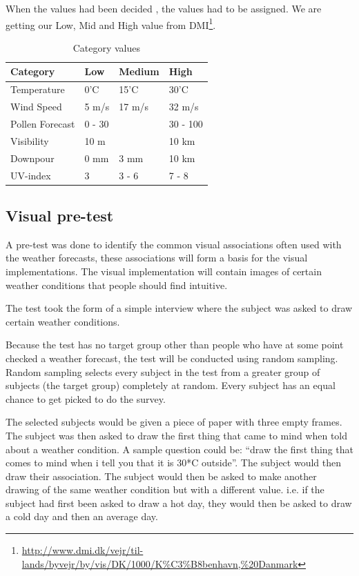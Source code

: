 When the values had been decided , the values had to be assigned. We are getting our Low, Mid and High value from DMI\footnote{\url{http://www.dmi.dk/vejr/til-lands/byvejr/by/vis/DK/1000/K\%C3\%B8benhavn,\%20Danmark}}.

\begin{table}[!h]
\centering
\begin{tabular}{l | l | l | l}
Category & Low & Medium & High \\
\hline \hline
Temperature & 0'C & 15'C & 30'C \\
Wind Speed & 5 m/s & 17 m/s & 32 m/s \\
Pollen Forecast & 0 - 30 & & 30 - 100 \\
Visibility & 10 m & & 10 km \\
Downpour & 0 mm & 3 mm & 10 km \\
UV-index & 3 & 3 - 6 & 7 - 8 
\end{tabular}
\caption{Category values}
\label{tab:category_values}
\end{table}


\subsection{Visual pre-test} %
\label{sub:visual_pre_test}

A pre-test was done to identify the common visual associations often used with the weather forecasts, these associations will form a basis for the visual implementations. 
The visual implementation will contain images of certain weather conditions that people should find intuitive.

The test took the form of a simple interview where the subject was asked to draw certain weather conditions.

Because the test has no target group other than people who have at some point checked a weather forecast, the test will be conducted using random sampling.
Random sampling selects every subject in the test from a greater group of subjects (the target group) completely at random. 
Every subject has an equal chance to get picked to do the survey.

The selected subjects would be given a piece of paper with three empty frames. 
The subject was then asked to draw the first thing that came to mind when told about a weather condition. 
A sample question could be: \enquote{draw the first thing that comes to mind when i tell you that it is 30*C outside}. 
The subject would then draw their association. 
The subject would then be asked to make another drawing of the same weather condition but with a different value. 
i.e. if the subject had first been asked to draw a hot day, they would then be asked to draw a cold day and then an average day.

